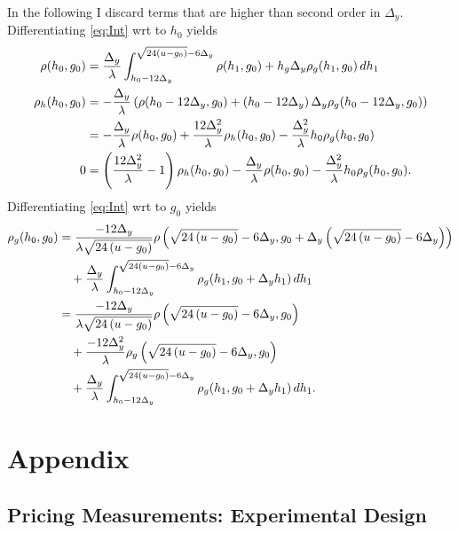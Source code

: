 \documentclass[]{article}
\begin{document}
In the following I discard terms that are higher than second order in
$\Delta_y$.  Differentiating \eqref{eq:Int}  wrt to $h_0$ yields 
\begin{align*}
  \rho(h_0,g_0) &= \frac{\Delta_y}{\lambda} \int_{h_0 - 12 \Delta_y}^{\sqrt{24(u-g_0)} - 6 \Delta_y}
  \rho(h_1, g_0)  + h_g \Delta_y \rho_g(h_1, g_0) \, dh_1 \\
  \rho_h(h_0, g_0) &= - \frac{\Delta_y}{\lambda} \left( \rho(h_0
    -12\Delta_y, g_0) + \left(h_0 - 12\Delta_y \right) \Delta_y \rho_g
    ( h_0 - 12\Delta_y, g_0) \right) \\
  &= - \frac{\Delta_y}{\lambda} \rho( h_0, g_0) + \frac{12
    \Delta^2_y}{\lambda} \rho_h( h_0, g_0) -
  \frac{\Delta^2_y}{\lambda} h_0 \rho_g(h_0, g_0) \\
  0 &= \left( \frac{12 \Delta^2_y}{\lambda} - 1 \right) \rho_h( h_0, g_0)
  - \frac{\Delta_y}{\lambda} \rho( h_0, g_0) -
  \frac{\Delta^2_y}{\lambda} h_0 \rho_g(h_0, g_0).
\end{align*}
Differentiating \eqref{eq:Int}  wrt to $g_0$ yields 
\begin{align*}
  \rho_g(h_0, g_0) %
  &= \frac{-12 \Delta_y} {\lambda \Rad{-g_0}}
  \rho\left( \Rad{-g_0} - 6\Delta_y, g_0  +\Delta_y \left( \Rad{-g_0}
      - 6 \Delta_y \right) \right) \\
  & \quad + \frac{\Delta_y}{\lambda} \int\RANGE \rho_g(h_1, g_0 +
  \Delta_y h_1) \, dh_1 \\
  &= \frac{-12 \Delta_y} {\lambda \Rad{-g_0}}
  \rho\left( \Rad{-g_0} -6\Delta_y, g_0  \right) \\
  & \quad + \frac{-12 \Delta^2_y} {\lambda}
  \rho_g\left( \Rad{-g_0} -6\Delta_y, g_0  \right) \\
  & \quad + \frac{\Delta_y}{\lambda} \int\RANGE \rho_g(h_1, g_0 +
  \Delta_y h_1) \, dh_1.
\end{align*}

\section{Appendix}
\label{sec:appendix}
 
\subsection{Pricing Measurements: Experimental Design}
\label{sec:pricing}
\end{document}
